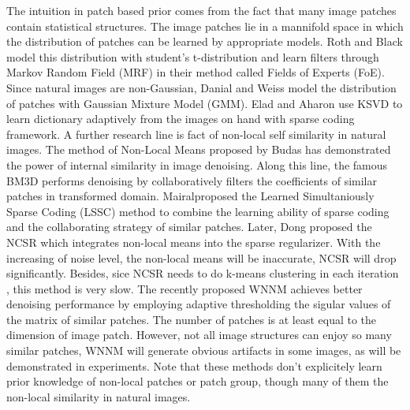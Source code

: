 \documentclass[10pt,twocolumn,letterpaper]{article}
\begin{document}
The intuition in patch based prior comes from the fact that many image patches contain statistical structures. The image patches lie in a mannifold space in which the distribution of patches can be learned by appropriate models. Roth and Black model this distribution with student's t-distribution and learn filters through Markov Random Field (MRF) in their method called Fields of Experts (FoE)\cite{foe}. Since natural images are non-Gaussian\cite{gsm,weissfreeman}, Danial and Weiss model the distribution of patches with Gaussian Mixture Model (GMM)\cite{epll}. Elad and Aharon use KSVD\cite{ksvd} to learn dictionary adaptively from the images on hand with sparse coding framework. A further research line is fact of non-local self similarity in natural images. The method of Non-Local Means\cite{nlm} proposed by Budas \etal has demonstrated the power of internal similarity in image denoising. Along this line, the famous BM3D\cite{bm3d} performs denoising by collaboratively filters the coefficients of similar patches in transformed domain. Mairal\etal proposed the Learned Simultaniously Sparse Coding (LSSC)\cite{lssc} method to combine the learning ability of sparse coding and the collaborating strategy of similar patches. Later, Dong \etal proposed the NCSR\cite{ncsr} which integrates non-local means into the sparse regularizer. With the increasing of noise level, the non-local means will be inaccurate, NCSR will drop significantly. Besides, sice NCSR needs to do k-means clustering in each iteration , this method is very slow. The recently proposed WNNM achieves better denoising performance by employing adaptive thresholding the sigular values of the matrix of similar patches. The number of patches is at least equal to the dimension of image patch. However, not all image structures can enjoy so many similar patches, WNNM will generate obvious artifacts in some images, as will be demonstrated in experiments. Note that these methods don't explicitely learn prior knowledge of non-local patches or patch group, though many of them the non-local similarity in natural images.
\end{document}
